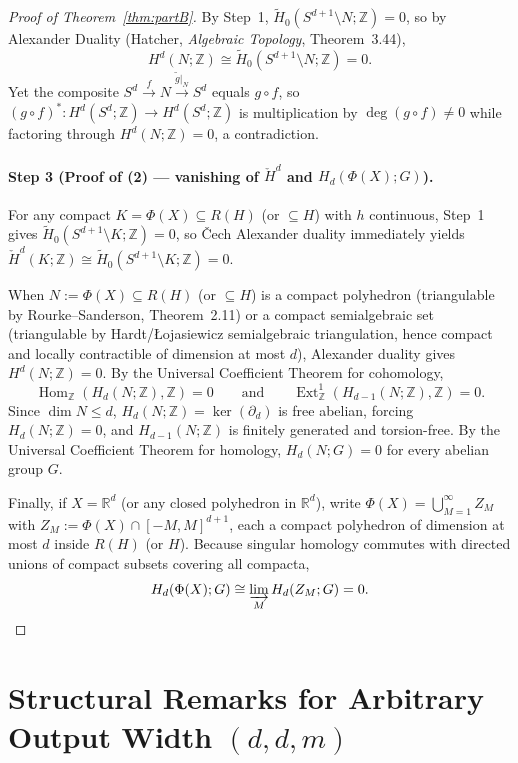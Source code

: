 \documentclass[11pt]{article}
\theoremstyle{plain}
\theoremstyle{definition}
\theoremstyle{remark}
\DeclareMathOperator{\Hom}{Hom}
\DeclareMathOperator{\Ext}{Ext}
\begin{document}
\begin{proof}[Proof of Theorem~\ref{thm:partB}]
By Step~1, $\tilde{H}_0(S^{d+1} \setminus N; \mathbb{Z}) = 0$, so by Alexander Duality (Hatcher, \emph{Algebraic Topology}, Theorem~3.44),
\[
H^d(N; \mathbb{Z}) \cong \tilde{H}_0(S^{d+1} \setminus N; \mathbb{Z}) = 0.
\]
Yet the composite $S^d \xrightarrow{f} N \xrightarrow{\tilde{g}|_N} S^d$ equals $g \circ f$, so $(g \circ f)^* : H^d(S^d; \mathbb{Z}) \to H^d(S^d; \mathbb{Z})$ is multiplication by $\deg(g \circ f) \neq 0$ while factoring through $H^d(N; \mathbb{Z}) = 0$, a contradiction.

\paragraph{Step 3 (Proof of (2) --- vanishing of $\check{H}^d$ and $H_d(\Phi(X); G)$).}
For any compact $K = \Phi(X) \subseteq R(H)$ (or $\subseteq H$) with $h$ continuous, Step~1 gives $\tilde{H}_0(S^{d+1} \setminus K; \mathbb{Z}) = 0$, so \v{C}ech Alexander duality immediately yields $\check{H}^d(K; \mathbb{Z}) \cong \tilde{H}_0(S^{d+1} \setminus K; \mathbb{Z}) = 0$.

When $N := \Phi(X) \subseteq R(H)$ (or $\subseteq H$) is a compact polyhedron (triangulable by Rourke--Sanderson, Theorem~2.11) or a compact semialgebraic set (triangulable by Hardt/\L{}ojasiewicz semialgebraic triangulation, hence compact and locally contractible of dimension at most $d$), Alexander duality gives $H^d(N; \mathbb{Z}) = 0$. By the Universal Coefficient Theorem for cohomology,
\[
\Hom_{\mathbb{Z}}(H_d(N; \mathbb{Z}), \mathbb{Z}) = 0
\qquad \text{and} \qquad
\Ext^1_{\mathbb{Z}}(H_{d-1}(N; \mathbb{Z}), \mathbb{Z}) = 0.
\]
Since $\dim N \le d$, $H_d(N; \mathbb{Z}) = \ker(\partial_d)$ is free abelian, forcing $H_d(N; \mathbb{Z}) = 0$, and $H_{d-1}(N; \mathbb{Z})$ is finitely generated and torsion-free. By the Universal Coefficient Theorem for homology, $H_d(N; G) = 0$ for every abelian group $G$.

Finally, if $X = \mathbb{R}^d$ (or any closed polyhedron in $\mathbb{R}^d$), write $\Phi(X) = \bigcup_{M=1}^\infty Z_M$ with $Z_M := \Phi(X) \cap [-M, M]^{d+1}$, each a compact polyhedron of dimension at most $d$ inside $R(H)$ (or $H$). Because singular homology commutes with directed unions of compact subsets covering all compacta,
\[
H_d(\Phi(X); G) \cong \varinjlim_M H_d(Z_M; G) = 0. \qedhere
\]
\end{proof}

\section{Structural Remarks for Arbitrary Output Width $(d, d, m)$}
\end{document}
